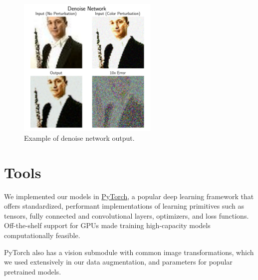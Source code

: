 \documentclass[justified]{article}
\begin{document}
  \begin{figure}[H]
    \centering
    \includegraphics[width=0.6\textwidth]{figures/denoise.png}
    \caption{
      Example of denoise network output.
    }
    \label{eq:denoise-example}
  \end{figure}

  \section{Tools}

  We implemented our models in \href{https://pytorch.org/}{PyTorch}, a popular deep learning framework that offers standardized, performant implementations of learning primitives such as tensors, fully connected and convolutional layers, optimizers, and loss functions.
  Off-the-shelf support for GPUs made training high-capacity models computationally feasible.


  PyTorch also has a vision submodule with common image transformations, which we used extensively in our data augmentation, and parameters for popular pretrained models.
\end{document}
